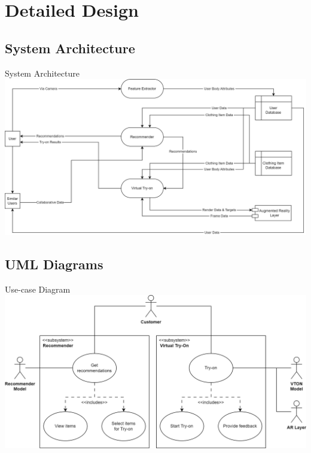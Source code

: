 \section{Detailed Design}

\subsection{System Architecture}
\begin{frame}{System Architecture}
	\includegraphics[width=\textwidth]{components/images/sys-arch.png}
\end{frame}

\subsection{UML Diagrams}
\begin{frame}{Use-case Diagram}
	\includegraphics[width=\textwidth]{components/images/use-case.png}
\end{frame}

